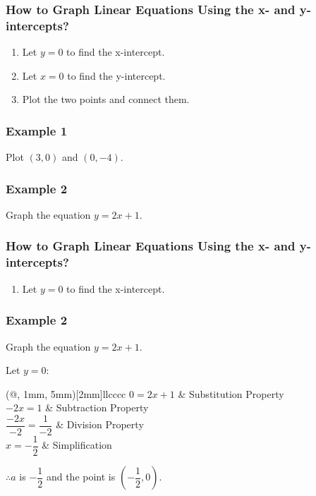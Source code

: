 \documentclass[14pt]{beamer}
\begin{document}
    \begin{frame}
    	\frametitle{How to Graph Linear Equations Using the x- and y-intercepts?}
    	\begin{enumerate}  
    		\item Let $ y = 0 $ to find the x-intercept.
    		\item Let $ x = 0 $ to find the y-intercept.
    		\item Plot the two points and connect them.
    	\end{enumerate} 
    \end{frame} 

    \begin{frame}
    	\frametitle{Example 1}
    	Plot $ (3, 0) $ and $ (0, -4) $.
    \end{frame}

   \begin{frame}
   	\frametitle{Example 2}
   	Graph the equation $ y = 2x + 1 $.
   \end{frame} 
   
   \begin{frame}
   	\frametitle{How to Graph Linear Equations Using the x- and y-intercepts?}
   	\begin{enumerate}  
   		\item Let $ y = 0 $ to find the x-intercept.
   	\end{enumerate} 
   \end{frame} 
   
   \begin{frame}
   	\frametitle{Example 2}
   	Graph the equation $ y = 2x + 1 $.
   	
   	\vone Let $ y = 0: $
   	
   	\vhalf
   	
   	\begin{TAB}(@, 1mm, 5mm)[2mm]{ll}{cccc}
   		\pause $ 0 = 2x + 1 $ & \pause Substitution Property \\
   		
   		\pause $ -2x = 1 $ & \pause Subtraction Property \\
   		   		
   		\pause  $ \dfrac{-2x}{-2} = \dfrac{1}{-2} $ & \pause Division Property\\
   		
   		\pause  $ x = -\dfrac{1}{2} $ & Simplification \\
   	\end{TAB}
   	
   	\pause $ \therefore a $ is $ -\dfrac{1}{2} $ and the point is $ \left(-\dfrac{1}{2}, 0 \right) $.
   \end{frame}
   
\end{document}
